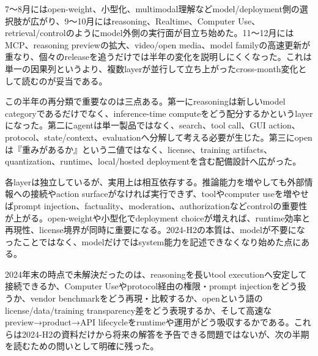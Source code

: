 7〜8月にはopen-weight、小型化、multimodal理解などmodel/deployment側の選択肢が広がり、9〜10月にはreasoning、Realtime、Computer Use、retrieval/controlのようにmodel外側の実行面が目立ち始めた。11〜12月にはMCP、reasoning previewの拡大、video/open media、model familyの高速更新が重なり、個々のreleaseを追うだけでは半年の変化を説明しにくくなった。これは単一の因果列というより、複数layerが並行して立ち上がったcross-month変化として読むのが妥当である。\autocite{src-bcbc025369e3,src-ee43656ed6da}


この半年の再分類で重要なのは三点ある。第一にreasoningは新しいmodel categoryであるだけでなく、inference-time computeをどう配分するかというlayerになった。第二にagentは単一製品ではなく、search、tool call、GUI action、protocol、state/context、evaluationへ分解して考える必要が生じた。第三にopenは『重みがあるか』という二値ではなく、license、training artifacts、quantization、runtime、local/hosted deploymentを含む配備設計へ広がった。\autocite{src-9cf289b414fd,src-ee43656ed6da}


各layerは独立しているが、実用上は相互依存する。推論能力を増やしても外部情報への接続やaction surfaceがなければ実行できず、toolやcomputer useを増やせばprompt injection、factuality、moderation、authorizationなどcontrolの重要性が上がる。open-weightや小型化でdeployment choiceが増えれば、runtime効率と再現性、license境界が同時に重要になる。2024-H2の本質は、modelが不要になったことではなく、modelだけではsystem能力を記述できなくなり始めた点にある。\autocite{src-3278a129a17e,src-9cf289b414fd}


2024年末の時点で未解決だったのは、reasoningを長いtool executionへ安定して接続できるか、Computer Useやprotocol経由の権限・prompt injectionをどう扱うか、vendor benchmarkをどう再現・比較するか、openという語のlicense/data/training transparency差をどう表現するか、そして高速なpreview→product→API lifecycleをruntimeや運用がどう吸収するかである。これらは2024-H2の資料だけから将来の解答を予告できる問題ではないが、次の半期を読むための問いとして明確に残った。\autocite{src-3278a129a17e,src-bcbc025369e3}


